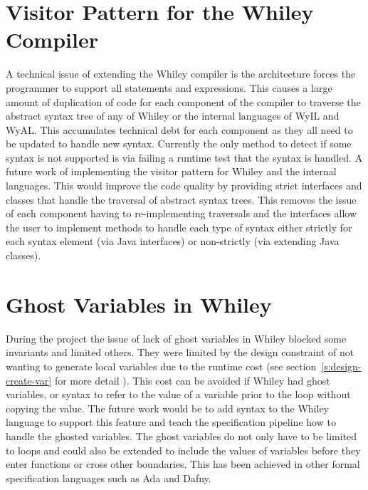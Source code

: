\section{Visitor Pattern for the Whiley Compiler}

A technical issue of extending the Whiley compiler is the architecture forces
the programmer to support all statements and expressions.
This causes a large amount of duplication of code for each component of the
compiler to traverse the abstract syntax tree of any of Whiley or the internal
languages of WyIL and WyAL.
This accumulates technical debt for each component as they all need to be
updated to handle new syntax.
Currently the only method to detect if some syntax is not supported is via 
failing a runtime test that the syntax is handled.
A future work of implementing the visitor pattern for Whiley and the internal
languages.
This would improve the code quality by providing strict interfaces and
classes that handle the traversal of abstract syntax trees.
This removes the issue of each component having to re-implementing traversals
and the interfaces allow the user to implement methods to handle each type of
syntax either strictly for each syntax element (via Java interfaces) or
non-strictly (via extending Java classes).

\section{Ghost Variables in Whiley}

During the project the issue of lack of ghost variables in Whiley blocked some
invariants and limited others.
They were limited by the design constraint of not wanting to generate local
variables due to the runtime cost (see section~\ref{s:design-create-var} for
more detail ).
This cost can be avoided if Whiley had ghost variables, or syntax to refer to
the value of a variable prior to the loop without copying the value.
The future work would be to add syntax to the Whiley language to support this
feature and teach the specification pipeline how to handle the ghosted
variables.
The ghost variables do not only have to be limited to loops and could also be 
extended to include the values of variables before they enter functions or
cross other boundaries.
This has been achieved in other formal specification languages such as Ada and
Dafny.

